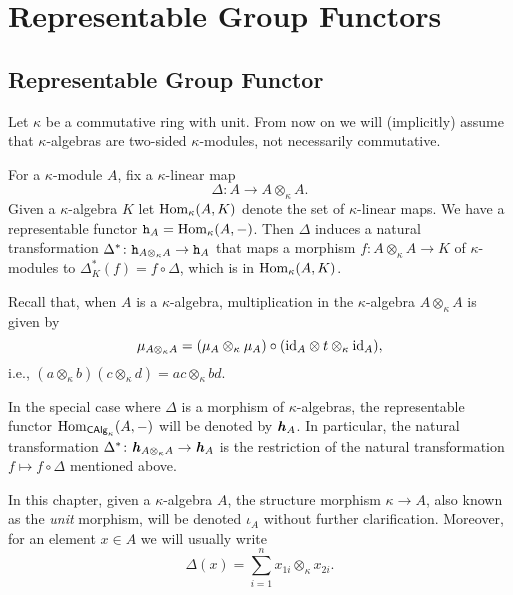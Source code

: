 \chapter{Representable Group Functors}\label{ch:representable}

\section{Representable Group Functor}

Let $\kappa$ be a commutative ring with unit. From now on we will (implicitly) assume that $\kappa$-algebras are two-sided $\kappa$-modules, not necessarily commutative.

For a $\kappa$-module $A$, fix a $\kappa$-linear map
$$
    \Delta\colon A\to A\otimes_\kappa A.
$$
Given a $\kappa$-algebra $K$ let ${\rm Hom}_\kappa(A,K)$ denote the set of $\kappa$-linear maps. We have a representable functor $\mathtt h_A={\rm Hom}_\kappa(A,-)$. Then $\Delta$ induces a natural transformation $\Delta^*\colon\mathtt h_{A\otimes_\kappa A}\to\mathtt h_A$ that maps a morphism $f\colon A\otimes_\kappa A\to K$ of $\kappa$-modules to $\Delta^*_K(f)=f\circ\Delta$, which is in ${\rm Hom}_\kappa(A,K)$.

Recall that, when $A$ is a $\kappa$-algebra, multiplication in the $\kappa$-algebra $A\otimes_\kappa A$ is given by
$$
    \mu_{A\otimes_\kappa A}=(\mu_A\otimes_\kappa\mu_A)
        \circ(\text{\rm id}_A\otimes t\otimes_\kappa\text{\rm id}_A),
$$
i.e., $(a\otimes_\kappa b)(c\otimes_\kappa d) = ac\otimes_\kappa bd$.

In the special case where $\Delta$ is a morphism of $\kappa$-algebras, the representable functor ${\rm Hom}_{\mathsf{CAlg}_\kappa}(A,-)$ will be denoted by $\textrm{\boldmath$\mathit h$}_A$. In particular, the natural transformation $\Delta^*\colon\textrm{\boldmath$\mathit h$}_{A\otimes_\kappa A}\to\textrm{\boldmath$\mathit h$}_A$ is the restriction of the natural transformation $f\mapsto f\circ\Delta$ mentioned above.

\begin{ntns}
    In this chapter, given a\/ $\kappa$-algebra\/ $A$, the structure morphism\/ $\kappa\to A$, also known as the \textsl{unit} morphism, will be denoted\/ $\iota_A$ without further clarification. Moreover, for an element $x\in A$ we will usually write
    $$
        \Delta(x) = \sum_{i=1}^nx_{1i}\otimes_\kappa x_{2i}.
    $$
\end{ntns}


